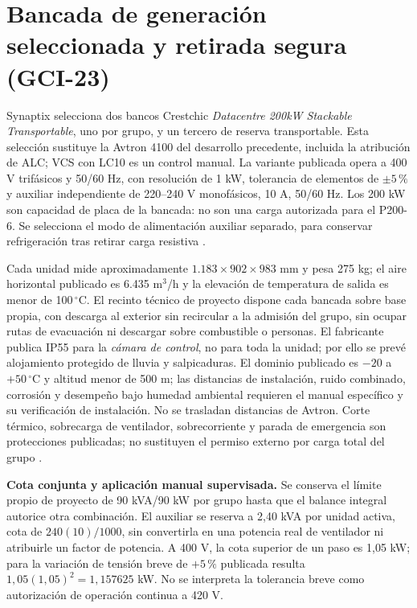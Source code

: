 \section{Bancada de generación seleccionada y retirada segura (GCI-23)}
\label{sec:sd4-bancada-gci23}

Synaptix selecciona dos bancos Crestchic \emph{Datacentre 200kW Stackable Transportable}, uno por grupo, y un tercero de reserva transportable. Esta selección sustituye la Avtron 4100 del desarrollo precedente, incluida la atribución de ALC; VCS con LC10 es un control manual. La variante publicada opera a 400 V trifásicos y 50/60 Hz, con resolución de 1 kW, tolerancia de elementos de $\pm5\,\%$ y auxiliar independiente de 220--240 V monofásicos, 10 A, 50/60 Hz. Los 200 kW son capacidad de placa de la bancada: no son una carga autorizada para el P200-6. Se selecciona el modo de alimentación auxiliar separado, para conservar refrigeración tras retirar carga resistiva \parencite[pp.~1--2]{lote23-crest200}.

Cada unidad mide aproximadamente $1.183\times902\times983$ mm y pesa 275 kg; el aire horizontal publicado es 6.435 m$^3$/h y la elevación de temperatura de salida es menor de 100\,$^{\circ}$C. El recinto técnico de proyecto dispone cada bancada sobre base propia, con descarga al exterior sin recircular a la admisión del grupo, sin ocupar rutas de evacuación ni descargar sobre combustible o personas. El fabricante publica IP55 para la \emph{cámara de control}, no para toda la unidad; por ello se prevé alojamiento protegido de lluvia y salpicaduras. El dominio publicado es $-20$ a $+50\,^{\circ}$C y altitud menor de 500 m; las distancias de instalación, ruido combinado, corrosión y desempeño bajo humedad ambiental requieren el manual específico y su verificación de instalación. No se trasladan distancias de Avtron. Corte térmico, sobrecarga de ventilador, sobrecorriente y parada de emergencia son protecciones publicadas; no sustituyen el permiso externo por carga total del grupo \parencite[p.~1]{lote23-crest200}.

\textbf{Cota conjunta y aplicación manual supervisada.} Se conserva el límite propio de proyecto de 90 kVA/90 kW por grupo hasta que el balance integral autorice otra combinación. El auxiliar se reserva a 2,40 kVA por unidad activa, cota de $240(10)/1000$, sin convertirla en una potencia real de ventilador ni atribuirle un factor de potencia. A 400 V, la cota superior de un paso es 1,05 kW; para la variación de tensión breve de $+5\,\%$ publicada resulta $1,05(1,05)^2=1,157625$ kW. No se interpreta la tolerancia breve como autorización de operación continua a 420 V.

